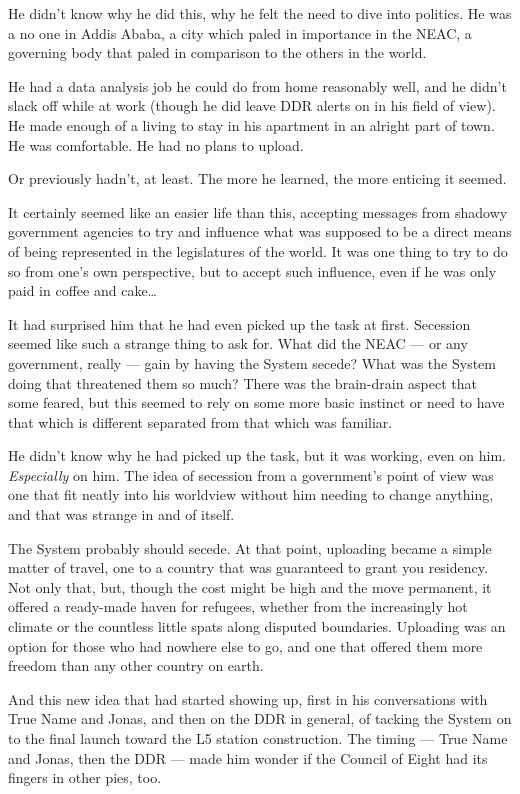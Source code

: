 He didn't know why he did this, why he felt the need to dive into politics. He was a no one in Addis Ababa, a city which paled in importance in the NEAC, a governing body that paled in comparison to the others in the world.

He had a data analysis job he could do from home reasonably well, and he didn't slack off while at work (though he did leave DDR alerts on in his field of view). He made enough of a living to stay in his apartment in an alright part of town. He was comfortable. He had no plans to upload.

Or previously hadn't, at least. The more he learned, the more enticing it seemed.

It certainly seemed like an easier life than this, accepting messages from shadowy government agencies to try and influence what was supposed to be a direct means of being represented in the legislatures of the world. It was one thing to try to do so from one's own perspective, but to accept such influence, even if he was only paid in coffee and cake\ldots{}

It had surprised him that he had even picked up the task at first. Secession seemed like such a strange thing to ask for. What did the NEAC — or any government, really — gain by having the System secede? What was the System doing that threatened them so much? There was the brain-drain aspect that some feared, but this seemed to rely on some more basic instinct or need to have that which is different separated from that which was familiar.

He didn't know why he had picked up the task, but it was working, even on him. \emph{Especially} on him. The idea of secession from a government's point of view was one that fit neatly into his worldview without him needing to change anything, and that was strange in and of itself.

The System probably should secede. At that point, uploading became a simple matter of travel, one to a country that was guaranteed to grant you residency. Not only that, but, though the cost might be high and the move permanent, it offered a ready-made haven for refugees, whether from the increasingly hot climate or the countless little spats along disputed boundaries. Uploading was an option for those who had nowhere else to go, and one that offered them more freedom than any other country on earth.

And this new idea that had started showing up, first in his conversations with True Name and Jonas, and then on the DDR in general, of tacking the System on to the final launch toward the L5 station construction. The timing — True Name and Jonas, then the DDR — made him wonder if the Council of Eight had its fingers in other pies, too.

